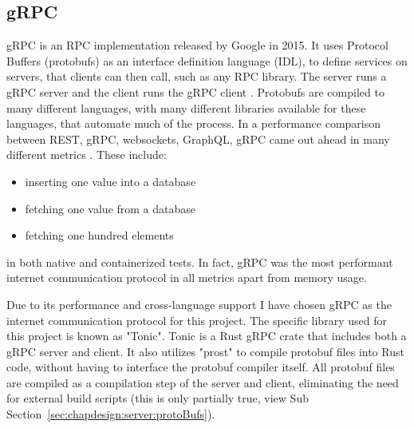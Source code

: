 \subsection{gRPC} \label{sec:chapdesign:technology:grpc}
gRPC is an RPC implementation released by Google in 2015. It uses Protocol Buffers (protobufs) as an interface definition language (IDL), to define services on servers, that clients can then call, such as any RPC library. The server runs a gRPC server and the client runs the gRPC client \cite{grpcHomepage}. Protobufs are compiled to many different languages, with many different libraries available for these languages, that automate much of the process. In a performance comparison between REST, gRPC, websockets, GraphQL, gRPC came out ahead in many different metrics \cite{reviewOfInternetProtocols}. These include: 
\begin{itemize}
    \item inserting one value into a database
    \item fetching one value from a database 
    \item fetching one hundred elements  
\end{itemize}
in both native and containerized tests. In fact, gRPC was the most performant internet communication protocol in all metrics apart from memory usage.

Due to its performance and cross-language support I have chosen gRPC as the internet communication protocol for this project. The specific library used for this project is known as "Tonic". Tonic is a Rust gRPC crate that includes both a gRPC server and client. It also utilizes "prost" to compile protobuf files into Rust code, without having to interface the protobuf compiler itself. All protobuf files are compiled as a compilation step of the server and client, eliminating the need for external build scripts (this is only partially true, view Sub Section~\ref{sec:chapdesign:server:protoBufs}).

